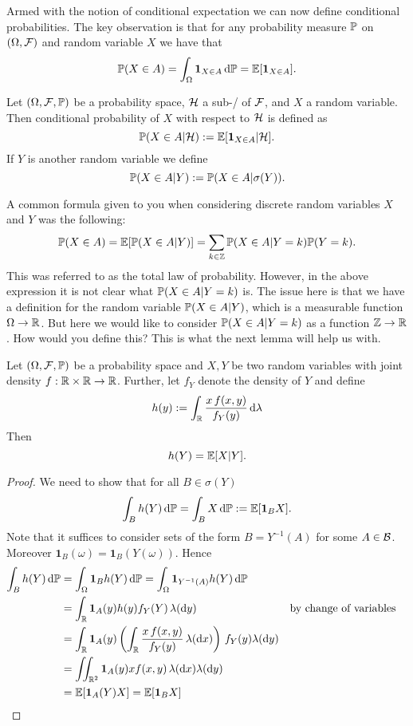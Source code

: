 Armed with the notion of conditional expectation we can now define conditional probabilities. The key observation is that for any probability measure $\mathbb P$ on $(\Omega, \mathcal F)$ and random variable $X$ we have that
\[
	\mathbb P(X \in A) = \int_\Omega \mathbf{1}_{X \in A} \, \mathrm{d} \mathbb P = \mathbb E[\mathbf{1}_{X \in A}].
\]

\begin{definition}
Let $(\Omega, \mathcal F, \mathbb P)$ be a probability space, $\mathcal H$ a sub-\sigalg/ of $\mathcal F$, and $X$ a random variable. Then conditional probability of $X$ with respect to $\mathcal H$ is defined as
\[
	\mathbb P(X \in A | \mathcal H) := \mathbb E[\mathbf{1}_{X \in A} | \mathcal H].
\]
If $Y$ is another random variable we define
\[
	\mathbb P(X \in A | Y) := \mathbb P(X \in A | \sigma(Y)).
\]
\end{definition}


A common formula given to you when considering discrete random variables $X$ and $Y$ was the following:
\begin{equation}\label{eq:law_of_probability_discrete}
	\mathbb P(X \in A) = \mathbb E[\mathbb P(X \in A | Y)] = \sum_{k \in \mathbb Z} \mathbb P(X \in A | Y= k) \mathbb P(Y = k). 
\end{equation}
This was referred to as the total law of probability. However, in the above expression it is not clear what $\mathbb P(X \in A | Y = k)$ is. The issue here is that we have a definition for the random variable $\mathbb P(X \in A | Y)$, which is a measurable function $\Omega \to \mathbb R$. But here we would like to consider $\mathbb P(X \in A | Y = k)$ as a function $\mathbb Z \to \mathbb R$. How would you define this? This is what the next lemma will help us with.

\begin{lemma}\label{lem:condition_expectation_Y_y}
Let $(\Omega, \mathcal F, \mathbb P)$ be a probability space and $X,Y$ be two random variables with joint density $f : \mathbb R \times \mathbb R \to \mathbb R$. Further, let $f_Y$ denote the density of $Y$ and define
\[
	h(y) := \int_{\mathbb R} \frac{x \, f(x,y)}{f_Y(y)} \, \mathrm{d} \lambda
\]
Then
\[
	h(Y) = \mathbb E[X | Y].
\]
\end{lemma}

\begin{proof}
We need to show that for all $B \in \sigma(Y)$
\[
	\int_B h(Y) \, \mathrm{d} \mathbb P = \int_B X \, \mathrm{d} \mathbb P := \mathbb E[\mathbf{1}_B X]. 
\]
Note that it suffices to consider sets of the form $B = Y^{-1}(A)$ for some $A \in \mathcal B$. Moreover $\mathbf{1}_B(\omega) = \mathbf{1}_B(Y(\omega))$. Hence
\begin{align*}
	\int_B h(Y) \, \mathrm{d} \mathbb P &= \int_\Omega \mathbf{1}_{B} h(Y) \, \mathrm{d} \mathbb P 
	= \int_\Omega \mathbf{1}_{Y^{-1}(A)} h(Y) \, \mathrm{d} \mathbb P \\
	&= \int_{\mathbb R} \mathbf{1}_{A}(y) h(y) f_Y(Y) \, \lambda (\mathrm{d} y) &&\text{by change of variables}\\
	&= \int_{\mathbb R} \mathbf{1}_A(y) \left(\int_{\mathbb R} \frac{x \, f(x,y)}{f_Y(y)} \, \lambda(\mathrm{d} x)\right)
		\, f_Y(y) \lambda(\mathrm{d} y)\\
	&= \iint_{\mathbb R^2} \mathbf{1}_A(y) x f(x,y) \, \lambda(\mathrm{d} x) \lambda(\mathrm{d} y)\\
	&= \mathbb E[\mathbf{1}_A(Y) X] = \mathbb E[\mathbf{1}_B X] \qedhere
\end{align*}
\end{proof}

